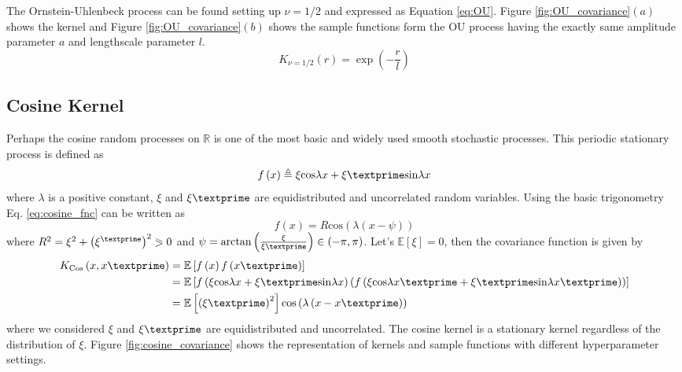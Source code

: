 The Ornstein-Uhlenbeck process can be found setting up $\nu=1/2$ and expressed as Equation \ref{eq:OU}. Figure \ref{fig:OU_covariance}$(a)$ shows the kernel and Figure \ref{fig:OU_covariance}$(b)$ shows the sample functions form the OU process having the exactly same amplitude parameter $a$ and lengthscale parameter $l$.  
\begin{equation} \label{eq:OU}
K_{\nu=1/2}(r)=	\exp \left(-\frac{r}{l} \right)
\end{equation}

\subsection{Cosine Kernel}
Perhaps the cosine random processes on $\mathbb{R}$ is one of the most  basic and widely used smooth stochastic processes. This periodic stationary process is defined as
\begin{equation} \label{eq:cosine_fnc}
f\left(x\right) \triangleq \xi\text{cos}\lambda x+ \xi\textprime \text{sin}\lambda x  
\end{equation}
where $\lambda$ is a positive constant, $\xi$ and $\xi\textprime$ are equidistributed and uncorrelated random variables. Using the basic trigonometry Eq. \ref{eq:cosine_fnc} can be written as
\begin{equation} \label{eq:cosine_fnc2}
f\left(x\right) = R \text{cos}\left(\lambda\left(x-\psi\right)\right) 
\end{equation}
where $R^2=\xi^2+\left(\xi^\textprime\right)^2\eqslantgtr 0$ and $\psi=\text{arctan}\left(\frac{\xi}{\xi\textprime}\right) \in \left(-\pi,\pi \right)$. Let's $\mathbb{E}\left[\xi\right]=0$, then the covariance function is given by
\begin{equation*} \label{eq:cosine_cov}
\begin{align}
K_{\text{Cos}}\left(x,x\textprime\right) 
    &= \mathbb{E}\left[f\left(x\right)f\left(x\textprime\right)\right]\\
    &= \mathbb{E}\left[f\left(\xi\text{cos}\lambda x+ \xi\textprime \text{sin}\lambda x\right)\left(f\left(\xi\text{cos}\lambda x\textprime+ \xi\textprime \text{sin}\lambda x\textprime\right)\right)\right]\\
    &= \mathbb{E}\left[\left(\xi\textprime\right)^2\right]\text{cos}\left(\lambda\left(x-x\textprime\right)\right)\\
\end{align}
\end{equation*}
where we considered  $\xi$ and $\xi\textprime$ are equidistributed and uncorrelated. The cosine kernel is a stationary kernel regardless of the distribution of $\xi$. Figure \ref{fig:cosine_covariance} shows the representation of kernels and sample functions with different hyperparameter settings.

